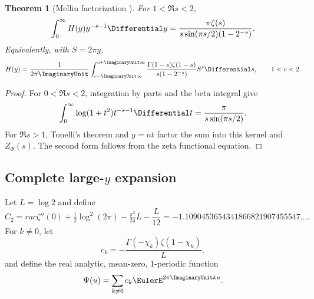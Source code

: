 \documentclass[11pt]{article}
\numberwithin{equation}{section}
\newtheorem{theorem}{Theorem}[section]
\theoremstyle{definition}
\theoremstyle{remark}
\begin{document}
\begin{theorem}[Mellin factorization \NewResult]
\label{p2:thm:Mellin}
For $1<\Re s<2$,
\begin{equation}
 \int_0^\infty H(y)y^{-s-1}\Differential y
 =\frac{\pi\zeta(s)}{s\sin(\pi s/2)(1-2^{-s})}.            \label{p2:eq:Mellin}
\end{equation}
Equivalently, with $S=2\pi y$,
\begin{equation}
 H(y)=\frac1{2\pi\ImaginaryUnit}\int_{c-\ImaginaryUnit\infty}^{c+\ImaginaryUnit\infty}
 \frac{\Gamma(1-s)\zeta(1-s)}{s(1-2^{-s})}S^s\Differential s,
 \qquad 1<c<2.                                             \label{p2:eq:Mellin-inv}
\end{equation}
\end{theorem}

\begin{proof}
For $0<\Re s<2$, integration by parts and the beta integral give
\begin{equation}
 \int_0^\infty\log(1+t^2)t^{-s-1}\Differential t
 =\frac{\pi}{s\sin(\pi s/2)}.                             \label{p2:eq:kernel-Mellin}
\end{equation}
For $\Re s>1$, Tonelli's theorem and $y=nt$ factor the sum into this kernel and
$Z_\Phi(s)$.  The second form follows from the zeta functional equation.
\end{proof}

\subsection{Complete large-$y$ expansion}

Let $L=\log2$ and define
\begin{equation}
 C_2=
rac{\zeta''(0)+\tfrac12\log^2(2\pi)-\tfrac{\pi^2}{24}}{L}
     -\frac{L}{12}
 =-1.1090453654341866821907455547\ldots.                  \label{p2:eq:C2}
\end{equation}
For $k\ne0$, let
\begin{equation}
 c_k=-\frac{\Gamma(-\chi_k)\zeta(1-\chi_k)}{L},            \label{p2:eq:ck}
\end{equation}
and define the real analytic, mean-zero, $1$-periodic function
\begin{equation}
 \Psi(u)=\sum_{k\ne0}c_k\EulerE^{2\pi\ImaginaryUnit ku}.                  \label{p2:eq:Psi}
\end{equation}
\end{document}
